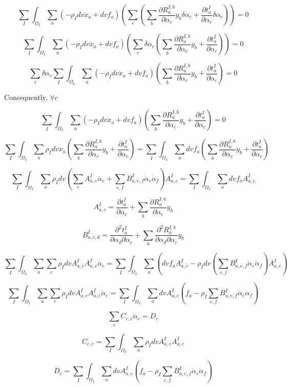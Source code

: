 \documentclass{article}
\begin{document}
$$
\sum_I \int_{\Omega_I} 
\sum_a (-\rho_I dv \ddot{x}_a + dv f_a) (
\sum_c( \sum_b \frac{ \partial R^{I,b}_a }{ \partial \alpha_c } y_b \delta \alpha_c
+ \frac{\partial t^I_a}{\partial \alpha_c} \delta \alpha_c ) ) = 0
$$

$$
\sum_I \int_{\Omega_I} 
\sum_a (-\rho_I dv \ddot{x}_a + dv f_a) (
\sum_c \delta \alpha_c ( \sum_b \frac{ \partial R^{I,b}_a }{ \partial \alpha_c } y_b 
+ \frac{\partial t^I_a}{\partial \alpha_c} ) ) = 0
$$

$$
\sum_c \delta \alpha_c
\sum_I \int_{\Omega_I} 
\sum_a (-\rho_I dv \ddot{x}_a + dv f_a) (
\sum_b \frac{ \partial R^{I,b}_a }{ \partial \alpha_c } y_b 
+ \frac{\partial t^I_a}{\partial \alpha_c} ) = 0
$$

Consequently, $\forall c$

$$
\sum_I \int_{\Omega_I} 
\sum_a (-\rho_I dv \ddot{x}_a + dv f_a) (
\sum_b \frac{ \partial R^{I,b}_a }{ \partial \alpha_c } y_b 
+ \frac{\partial t^I_a}{\partial \alpha_c} ) = 0
$$

$$
\sum_I \int_{\Omega_I} 
\sum_a \rho_I dv \ddot{x}_a (
\sum_b \frac{ \partial R^{I,b}_a }{ \partial \alpha_c } y_b 
+ \frac{\partial t^I_a}{\partial \alpha_c} ) =
\sum_I \int_{\Omega_I} 
\sum_a dv f_a (
\sum_b \frac{ \partial R^{I,b}_a }{ \partial \alpha_c } y_b 
+ \frac{\partial t^I_a}{\partial \alpha_c} )
$$

$$
\sum_I \int_{\Omega_I} 
\sum_a \rho_I dv 
( \sum_{e} A^I_{a,e} \ddot{\alpha}_e + \sum_{e,f} B^I_{a,e,f} \dot{\alpha}_e \dot{\alpha}_f )
A^I_{a,c} =
\sum_I \int_{\Omega_I} 
\sum_a dv f_a A^I_{a,c}
$$

$$
A^I_{a,c} = \frac{\partial t^I_a}{\partial \alpha_c} +  \sum_{b} \frac{ \partial R^{I,b}_a }{ \partial \alpha_c } y_b
$$

$$
B^I_{a,c,d} = \frac{\partial^2 t^I_a}{\partial \alpha_d \partial \alpha_c} + \sum_{b} \frac{ \partial^2 R^{I,b}_a }{ \partial \alpha_d \partial \alpha_c } y_b
$$

$$
\sum_I \int_{\Omega_I} 
\sum_a \sum_e \rho_I dv 
 A^I_{a,e} A^I_{a,c} \ddot{\alpha}_e
=
\sum_I \int_{\Omega_I} 
\sum_a (
dv f_a A^I_{a,c}
-
\rho_I dv 
( \sum_{e,f} B^I_{a,e,f} \dot{\alpha}_e \dot{\alpha}_f )
A^I_{a,c} )
$$

$$
\sum_I \int_{\Omega_I} 
\sum_a \sum_e \rho_I dv 
 A^I_{a,e} A^I_{a,c} \ddot{\alpha}_e
=
\sum_I \int_{\Omega_I} \sum_a dv A^I_{a,c}
( f_a - \rho_I \sum_{e,f} B^I_{a,e,f} \dot{\alpha}_e \dot{\alpha}_f )
$$

$$
\sum_e C_{c,e} \ddot{\alpha}_e = D_c
$$

$$
C_{c,e} =
\sum_I \int_{\Omega_I}
\sum_a \rho_I dv
 A^I_{a,e} A^I_{a,c}
$$

$$
D_c =
\sum_I \int_{\Omega_I} \sum_a dv A^I_{a,c}
( f_a - \rho_I \sum_{e,f} B^I_{a,e,f} \dot{\alpha}_e \dot{\alpha}_f )
$$
\end{document}
